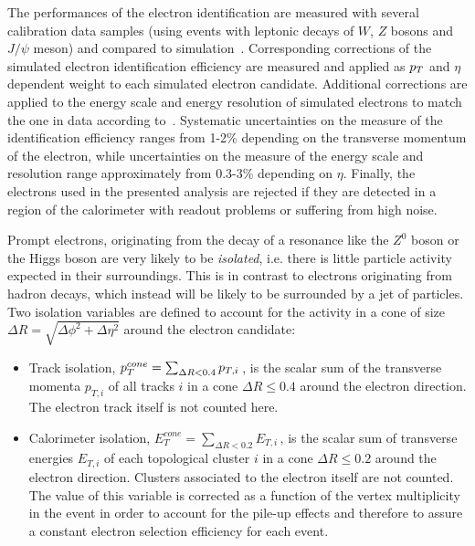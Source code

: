 The performances of the electron identification are measured with several calibration  
data samples (using events with leptonic decays of $W$, $Z$ bosons and $J/\psi$ meson) 
and compared to simulation~\cite{eleEff}. Corresponding corrections of the simulated electron identification efficiency are measured
 and applied as $p_{T}$ and $\eta$ dependent weight to each simulated electron candidate. Additional corrections are applied to the energy 
scale and energy resolution of simulated electrons to match the one in data according to~\cite{eleEnergy}.
Systematic uncertainties on the measure of the identification efficiency ranges from 1-2\% depending on the transverse momentum of the electron,
while uncertainties on the measure of the energy scale and resolution range approximately from 0.3-3\% depending on $\eta$.
Finally, the electrons used in the presented analysis are rejected if  they are detected in a region of the 
calorimeter with readout problems or suffering from high noise.

Prompt electrons, originating from the decay of a resonance like the $Z^0$ boson or the Higgs boson are very
likely to be \emph{isolated}, i.e. there is little particle activity expected in their surroundings. This is in contrast
to electrons originating from  hadron decays, which instead will be likely to be surrounded by a jet of particles.
Two isolation variables are defined to account for the activity in a cone of size $\Delta R = \sqrt{\Delta\phi^2 + \Delta\eta^2}$ 
around the electron candidate:
\begin{itemize}
	\item Track isolation, $ p_{T}^{cone}  =  \sum_{\Delta R < 0.4}  p_{T,i} \,$,  is the scalar sum of the transverse momenta $ p_{T,i}$ of all tracks $i$ in a cone 
	$\Delta R \leq 0.4$ around the electron direction. The electron track itself is not counted here.
	
	\item Calorimeter isolation, $E_T^{cone} = \sum_{\Delta R < 0.2}  E_{T,i} \,$, is the scalar sum of  
	 transverse energies $ E_{T,i}$ of each topological cluster $i$ 
	 in a  cone  $\Delta R \leq 0.2$  around the electron direction. Clusters associated to the electron itself are not counted.
	 The value of this variable is corrected as a function of the vertex multiplicity in the event 
	in order to account for the pile-up effects and therefore to assure a constant electron  selection efficiency for each event.
\end{itemize}



